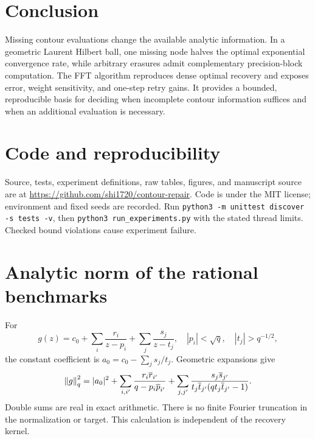 \documentclass[11pt]{article}
\begin{document}
\section{Conclusion}
Missing contour evaluations change the available analytic information. In a geometric Laurent Hilbert ball, one missing node halves the optimal exponential convergence rate, while arbitrary erasures admit complementary precision-block computation. The FFT algorithm reproduces dense optimal recovery and exposes error, weight sensitivity, and one-step retry gains. It provides a bounded, reproducible basis for deciding when incomplete contour information suffices and when an additional evaluation is necessary.

\section*{Code and reproducibility}
Source, tests, experiment definitions, raw tables, figures, and manuscript source are at \url{https://github.com/shi1720/contour-repair}. Code is under the MIT license; environment and fixed seeds are recorded. Run \texttt{python3 -m unittest discover -s tests -v}, then \texttt{python3 run\_experiments.py} with the stated thread limits. Checked bound violations cause experiment failure.

\appendix
\section{Analytic norm of the rational benchmarks}
For
\[
g(z)=c_0+\sum_i\frac{r_i}{z-p_i}+\sum_j\frac{s_j}{z-t_j},
\quad |p_i|<\sqrt q,\quad |t_j|>q^{-1/2},
\]
the constant coefficient is $a_0=c_0-\sum_js_j/t_j$. Geometric expansions give
\begin{equation}
\left\lVert g\right\rVert_q^2=|a_0|^2+
\sum_{i,i'}\frac{r_i\overline r_{i'}}{q-p_i\overline p_{i'}}+
\sum_{j,j'}\frac{s_j\overline s_{j'}}{t_j\overline t_{j'}(qt_j\overline t_{j'}-1)}.
\label{eq:rationalnorm}
\end{equation}
Double sums are real in exact arithmetic. There is no finite Fourier truncation in the normalization or target. This calculation is independent of the recovery kernel.
\end{document}
